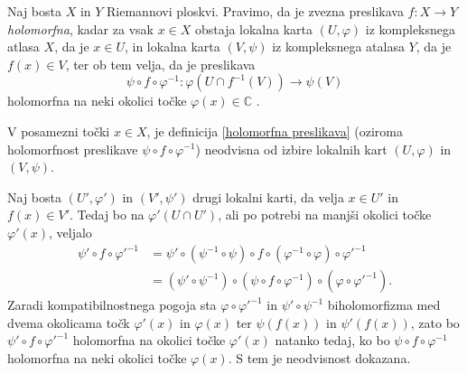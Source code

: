 \documentclass[mat1]{fmfdelo}
\numberwithin{equation}{section}
\newcommand{\C}{\mathbb C}
\newcommand{\inv}{^{-1}}
\theoremstyle{definition}
\begin{document}


\begin{definicija}
    \label{holomorfna preslikava}
    Naj bosta $X$ in $Y$ Riemannovi ploskvi. Pravimo, da je zvezna preslikava $f:X \to Y$ \emph{holomorfna}, kadar za vsak $x \in X$ obstaja lokalna karta $(U, \varphi)$ iz kompleksnega atlasa $X$, da je $x \in U$, in lokalna karta $(V, \psi)$ iz kompleksnega atalasa $Y$, da je $f(x) \in V$, ter ob tem velja, da je preslikava  
    \[
        \psi \circ f \circ \varphi\inv : \varphi(U \cap f\inv(V)) \to \psi(V)
    \]
    holomorfna na neki okolici točke $\varphi(x) \in \C$ .
\end{definicija}

\begin{trditev}
    V posamezni točki $x \in X$, je definicija \ref{holomorfna preslikava} (oziroma holomorfnost preslikave $\psi \circ f \circ \varphi\inv$) neodvisna od izbire lokalnih kart $(U, \varphi)$ in $(V, \psi)$. 
\end{trditev}

\begin{dokaz}
    Naj bosta $(U', \varphi')$ in $(V', \psi')$ drugi lokalni karti, da velja $x \in U'$ in $f(x) \in V'$. Tedaj bo na $\varphi'(U \cap U')$, ali po potrebi na manjši okolici točke $\varphi'(x)$, veljalo
    \begin{align*}    
        \psi' \circ f \circ {\varphi'}\inv &= 
        \psi' \circ (\psi\inv \circ \psi) \circ f \circ (\varphi\inv \circ \varphi) \circ {\varphi'}\inv \\
        &= (\psi' \circ \psi\inv) \circ (\psi \circ f \circ \varphi\inv) \circ (\varphi \circ {\varphi'}\inv).
    \end{align*}
    Zaradi kompatibilnostnega pogoja sta $\varphi \circ {\varphi'}\inv$ in $\psi' \circ \psi\inv$ biholomorfizma med dvema okolicama točk $\varphi'(x)$ in $\varphi(x)$ ter $\psi(f(x))$ in $\psi'(f(x))$, zato bo $\psi' \circ f \circ {\varphi'}\inv$ holomorfna na okolici točke $\varphi'(x)$ natanko tedaj, ko bo $\psi \circ f \circ \varphi\inv$ holomorfna na neki okolici točke $\varphi(x)$. S tem je neodvisnost dokazana. 
\end{dokaz}
\end{document}
